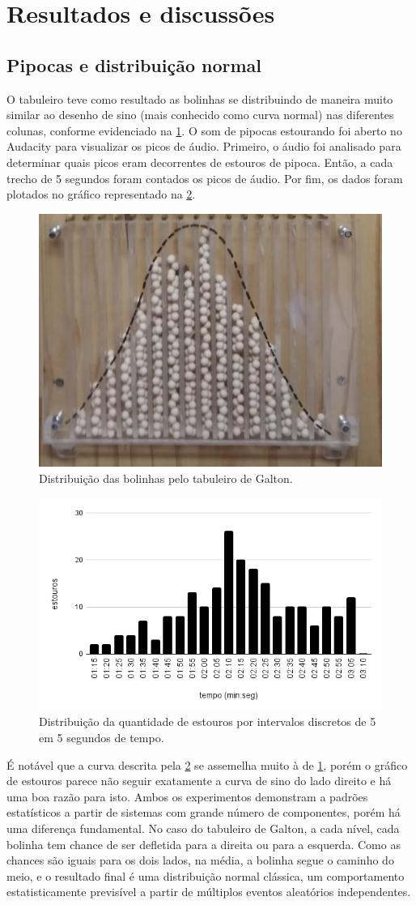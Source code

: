 \section{Resultados e discussões}

\subsection{Pipocas e distribuição normal}
O tabuleiro teve como resultado as bolinhas se distribuindo de maneira muito similar ao desenho de sino (mais conhecido como curva normal) nas diferentes colunas, conforme evidenciado na \cref{distbolinha}. O som de pipocas estourando foi aberto no Audacity para visualizar os picos de áudio. Primeiro, o áudio foi analisado para determinar quais picos eram decorrentes de estouros de pipoca. Então, a cada trecho de 5 segundos foram contados os picos de áudio. Por fim, os dados foram plotados no gráfico representado na \cref{estouros}.

\begin{figure}[H]
    \centering
    \includegraphics[width=.5\linewidth]{fig/DistNorm}
    \caption{Distribuição das bolinhas pelo tabuleiro de Galton.}\label{distbolinha}
\end{figure}
\begin{figure}[H]
    \centering
    \includegraphics[width=.5\linewidth]{fig/distEstouros}
    \caption{Distribuição da quantidade de estouros por intervalos discretos de 5 em 5 segundos de tempo.}\label{estouros}
\end{figure}

É notável que a curva descrita pela \cref{estouros} se assemelha muito à de \cref{distbolinha}, porém o gráfico de estouros parece não seguir exatamente a curva de sino do lado direito e há uma boa razão para isto. Ambos os experimentos demonstram a padrões estatísticos a partir de sistemas com grande número de componentes, porém há uma diferença fundamental. No caso do tabuleiro de Galton, a cada nível, cada bolinha tem chance de ser defletida para a direita ou para a esquerda. Como as chances são iguais para os dois lados, na média, a bolinha segue o caminho do meio, e o resultado final é uma distribuição normal clássica, um comportamento estatisticamente previsível a partir de múltiplos eventos aleatórios independentes.


